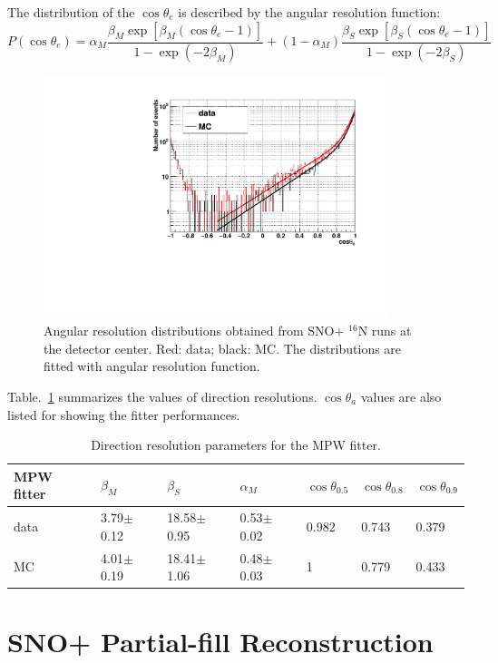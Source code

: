 \documentclass[preprint,12pt]{elsarticle}
\numberwithin{equation}{section}
\begin{document}
The distribution of the $\cos\theta_e$ is described by the angular resolution function\cite{boulay}:
\begin{equation}
P(\cos\theta_e)=\alpha_M\frac{\beta_M\exp[\beta_M(\cos\theta_e-1)]}{1-\exp(-2\beta_M)}+(1-\alpha_M)\frac{\beta_S\exp[\beta_S(\cos\theta_e-1)]}{1-\exp(-2\beta_S)}
\end{equation}

\begin{figure}[!htb]
	\centering
	\includegraphics[width=10cm]{angularResol.pdf}
	\caption{Angular resolution distributions obtained from SNO+ {$^{16}$}N runs at the detector center. Red: data; black: MC. The distributions are fitted with angular resolution function.}
	\label{angularesol}
\end{figure}

Table.~\ref{directResol} summarizes the values of direction resolutions. $\cos\theta_a$ values are also listed for showing the fitter performances.

\begin{table}[ht]
	\centering
	\caption{Direction resolution parameters for the MPW fitter.}
	\label{directResol}
\begin{tabular}{|p{2.2cm}|p{1.8cm}|p{2cm}|p{2cm}|p{1.1cm}|p{1.1cm}|p{1.1cm}| }
\hline
MPW fitter& $\beta_M$ &  $\beta_S$ & $\alpha_M$ & $\cos\theta_{0.5}$ & $\cos\theta_{0.8}$& $\cos\theta_{0.9}$\\
\hline
data & 3.79$\pm$0.12 & 18.58$\pm$0.95 & 0.53$\pm$0.02& 0.982 & 0.743 & 0.379\\
\hline
MC &4.01$\pm$0.19 & 18.41$\pm$1.06 & 0.48$\pm$0.03 & 1 & 0.779 & 0.433  \\
\hline
\end{tabular}
\end{table}

\section{SNO+ Partial-fill Reconstruction}
\end{document}
